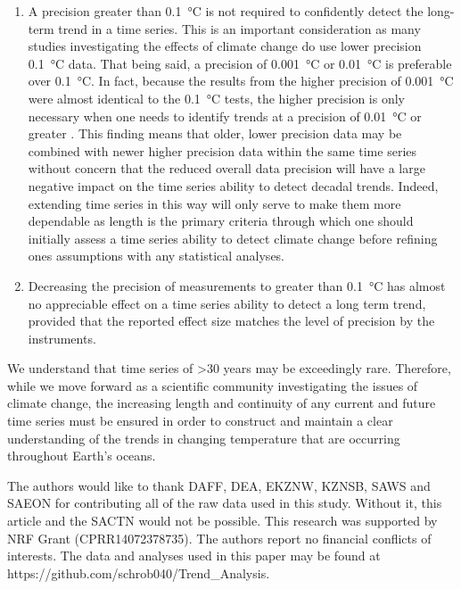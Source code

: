 \documentclass{ametsoc}
\begin{document}
\begin{enumerate}
\item A precision greater than \SI{0.1}{\degreeCelsius} is not required to confidently detect the long-term trend in a time series. This is an important consideration as many studies investigating the effects of climate change \citep[e.g.][]{Grant2010, Scherrer2010, Lathlean2012} do use lower precision \SI{0.1}{\degreeCelsius} data. That being said, a precision of \SI{0.001}{\degreeCelsius} or \SI{0.01}{\degreeCelsius} is preferable over \SI{0.1}{\degreeCelsius}. In fact, because the results from the higher precision of \SI{0.001}{\degreeCelsius} were almost identical to the \SI{0.1}{\degreeCelsius} tests, the higher precision is only necessary when one needs to identify trends at a precision of \SI{0.01}{\degreeCelsius} or greater \citep{Karl2015}. This finding means that older, lower precision data may be combined with newer higher precision data within the same time series without concern that the reduced overall data precision will have a large negative impact on the time series ability to detect decadal trends. Indeed, extending time series in this way will only serve to make them more dependable as length is the primary criteria through which one should initially assess a time series ability to detect climate change before refining ones assumptions with any statistical analyses.

\item Decreasing the precision of measurements to greater than \SI{0.1}{\degreeCelsius} has almost no appreciable effect on a time series ability to detect a long term trend, provided that the reported effect size matches the level of precision by the instruments.
\end{enumerate}

We understand that time series of >30 years may be exceedingly rare. Therefore, while we move forward as a scientific community investigating the issues of climate change, the increasing length and continuity of any current and future time series must be ensured in order to construct and maintain a clear understanding of the trends in changing temperature that are occurring throughout Earth's oceans.

%

\acknowledgments
The authors would like to thank DAFF, DEA, EKZNW, KZNSB, SAWS and SAEON for contributing all of the raw data used in this study. Without it, this article and the SACTN would not be possible. This research was supported by NRF Grant (CPRR14072378735). The authors report no financial conflicts of interests. The data and analyses used in this paper may be found at https://github.com/schrob040/Trend_Analysis.
\end{document}
